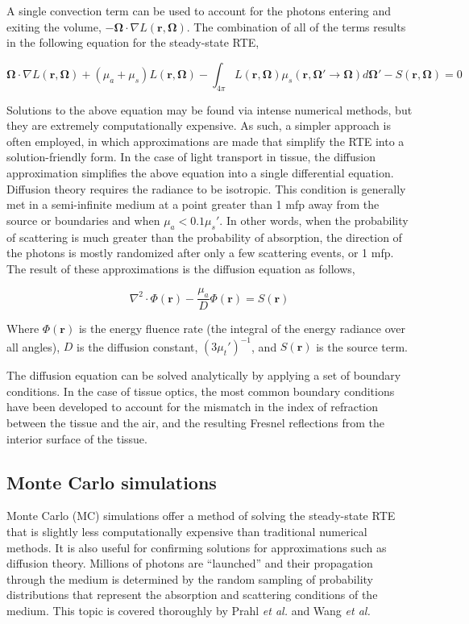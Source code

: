 \noindent A single convection term can be used to account for the photons entering and exiting the volume, $-\mathbf{\Omega}\cdot\nabla L(\mathbf{r},\mathbf{\Omega})$. The combination of all of the terms results in the following equation for the steady-state RTE,\cite{Farrell2003}

\begin{equation}
\label{eq:rte}
\mathbf{\Omega}\cdot\nabla L(\mathbf{r},\mathbf{\Omega}) + (\mu_a + \mu_s) L(\mathbf{r},\mathbf{\Omega}) - \int_{4\pi} L(\mathbf{r},\mathbf{\Omega}) \mu_s(\mathbf{r},\mathbf{\Omega}' \rightarrow \mathbf{\Omega}) d \mathbf{\Omega'} - S(\mathbf{r},\mathbf{\Omega}) = 0
\end{equation}

Solutions to the above equation may be found via intense numerical methods, but they are extremely computationally expensive. As such, a simpler approach is often employed, in which approximations are made that simplify the RTE into a solution-friendly form. In the case of light transport in tissue, the diffusion approximation simplifies the above equation into a single differential equation.
Diffusion theory requires the radiance to be isotropic. This condition is generally met in a semi-infinite medium at a point greater than 1 mfp away from the source or boundaries\cite{Jacques2004} and when $ \mu_a < 0.1\mu_s'$.\cite{Wilson2008} In other words, when the probability of scattering is much greater than the probability of absorption, the direction of the photons is mostly randomized after only a few scattering events, or 1 mfp. The result of these approximations is the diffusion equation as follows,

\begin{equation}
\label{eq:diffeq}
\nabla^2 \cdot \Phi(\mathbf{r}) - \frac{\mu_a}{D}\Phi(\mathbf{r}) = S(\mathbf{r})
\end{equation}

Where $\Phi(\mathbf{r})$ is the energy fluence rate (the integral of the energy radiance over all angles), $D$ is the diffusion constant, $(3\mu_t')^{-1}$, and $S(\mathbf{r})$ is the source term.

The diffusion equation can be solved analytically by applying a set of boundary conditions. In the case of tissue optics, the most common boundary conditions have been developed to account for the mismatch in the index of refraction between the tissue and the air, and the resulting Fresnel reflections from the interior surface of the tissue.

\subsection{Monte Carlo simulations}
Monte Carlo (MC) simulations offer a method of solving the steady-state RTE that is slightly less computationally expensive than traditional numerical methods. It is also useful for confirming solutions for approximations such as diffusion theory. Millions of photons are ``launched'' and their propagation through the medium is determined by the random sampling of probability distributions that represent the absorption and scattering conditions of the medium. This topic is covered thoroughly by Prahl \emph{et al.}\cite{Prahl1989} and Wang \emph{et al.}\cite{Wang1995}

